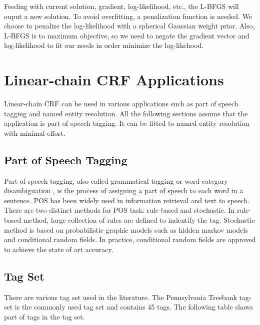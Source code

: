 Feeding with current solution, gradient, log-likelihood, etc., the L-BFGS will ouput a new solution.
To avoid overfitting, a penalization function is needed. We choose to penalize the log-likelihood with a spherical Gaussian weight prior.
Also, L-BFGS is to maximum objective, so we need to negate the gradient vector and log-likelihood to fit our needs in order minimize the log-likehood.

\section{Linear-chain CRF Applications}
Linear-chain CRF can be used in various applications such as  part of speech tagging and named entity resolution.
All the following sections assume that the application is part of speech tagging. It can be fitted to named entity resolution with minimal effort. 

\subsection{Part of Speech Tagging}
Part-of-speech tagging, also called grammatical tagging or word-category disambiguation \cite{DBLP:journals/coling/DeRose88}, is the process of assigning 
a part of speech to each word in a sentence. POS has been widely used in information retrieval and text to speech. There are two distinct methods for 
POS task: rule-based and stochastic.
In rule-based method, large collection of rules are defined to indentify the tag. Stochastic method is based on probabilistic 
graphic models such as hidden markov models and conditional random fields. In practice, conditional random fields are approved 
to achieve the state of art accuracy.
\subsection{Tag Set}
There are various tag set used in the literature. The Pennsylvania Treebank tag-set \cite{DBLP:journals/coling/MarcusSM94} is the commonly used tag set and contains
45 tags. The following table shows part of tags in the tag set.

